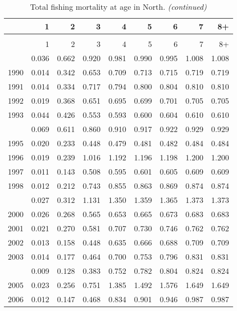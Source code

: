 \documentclass[
]{article}
\begin{document}
\begin{longtable}[t]{lrrrrrrrr}
\caption{\label{tab:North-region-FAA-table}Total fishing mortality at age in North.}\\
\toprule
  & 1 & 2 & 3 & 4 & 5 & 6 & 7 & 8+\\
\midrule
\endfirsthead
\caption[]{Total fishing mortality at age in North. \textit{(continued)}}\\
\toprule
  & 1 & 2 & 3 & 4 & 5 & 6 & 7 & 8+\\
\midrule
\endhead

\endfoot
\bottomrule
\endlastfoot
1989 & 0.036 & 0.662 & 0.920 & 0.981 & 0.990 & 0.995 & 1.008 & 1.008\\
1990 & 0.014 & 0.342 & 0.653 & 0.709 & 0.713 & 0.715 & 0.719 & 0.719\\
1991 & 0.014 & 0.334 & 0.717 & 0.794 & 0.800 & 0.804 & 0.810 & 0.810\\
1992 & 0.019 & 0.368 & 0.651 & 0.695 & 0.699 & 0.701 & 0.705 & 0.705\\
1993 & 0.044 & 0.426 & 0.553 & 0.593 & 0.600 & 0.604 & 0.610 & 0.610\\
\addlinespace
1994 & 0.069 & 0.611 & 0.860 & 0.910 & 0.917 & 0.922 & 0.929 & 0.929\\
1995 & 0.020 & 0.233 & 0.448 & 0.479 & 0.481 & 0.482 & 0.484 & 0.484\\
1996 & 0.019 & 0.239 & 1.016 & 1.192 & 1.196 & 1.198 & 1.200 & 1.200\\
1997 & 0.011 & 0.143 & 0.508 & 0.595 & 0.601 & 0.605 & 0.609 & 0.609\\
1998 & 0.012 & 0.212 & 0.743 & 0.855 & 0.863 & 0.869 & 0.874 & 0.874\\
\addlinespace
1999 & 0.027 & 0.312 & 1.131 & 1.350 & 1.359 & 1.365 & 1.373 & 1.373\\
2000 & 0.026 & 0.268 & 0.565 & 0.653 & 0.665 & 0.673 & 0.683 & 0.683\\
2001 & 0.021 & 0.270 & 0.581 & 0.707 & 0.730 & 0.746 & 0.762 & 0.762\\
2002 & 0.013 & 0.158 & 0.448 & 0.635 & 0.666 & 0.688 & 0.709 & 0.709\\
2003 & 0.014 & 0.177 & 0.464 & 0.700 & 0.753 & 0.796 & 0.831 & 0.831\\
\addlinespace
2004 & 0.009 & 0.128 & 0.383 & 0.752 & 0.782 & 0.804 & 0.824 & 0.824\\
2005 & 0.023 & 0.256 & 0.751 & 1.385 & 1.492 & 1.576 & 1.649 & 1.649\\
2006 & 0.012 & 0.147 & 0.468 & 0.834 & 0.901 & 0.946 & 0.987 & 0.987\\

\end{longtable}
\end{document}
